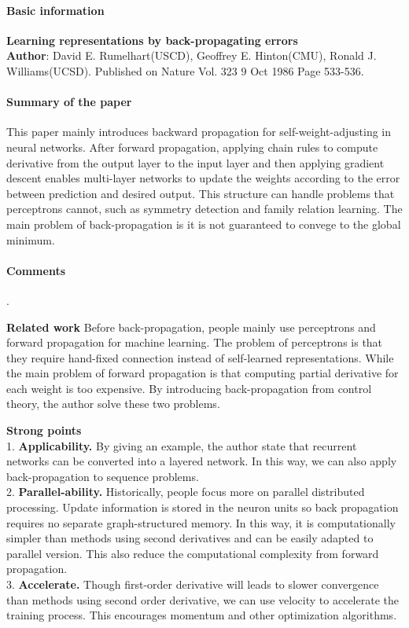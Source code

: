 \documentclass{article}
\begin{document}
\thispagestyle{empty}
\paragraph{Basic information}
\textbf{Learning representations by back-propagating errors}\\
\textbf{Author}: David E. Rumelhart(USCD), Geoffrey E. Hinton(CMU), Ronald J. Williams(UCSD). Published on Nature Vol. 323 9 Oct 1986 Page 533-536.

\paragraph{Summary of the paper}This paper mainly introduces backward propagation for self-weight-adjusting in neural networks. After forward propagation, applying chain rules to compute derivative from the output layer to the input layer and then applying gradient descent enables multi-layer networks to update the weights according to the error between prediction and desired output. This structure can handle problems that perceptrons cannot, such as symmetry detection and family relation learning. The main problem of back-propagation is it is not guaranteed to convege to the global minimum.

\paragraph{Comments}.

\textbf{Related work} Before back-propagation, people mainly use perceptrons and forward propagation for machine learning. The problem of perceptrons is that they require hand-fixed connection instead of self-learned representations. While the main problem of forward propagation is that computing partial derivative for each weight is too expensive. By introducing back-propagation from control theory, the author solve these two problems.

\textbf{Strong points}\\
1. \textbf{Applicability.} By giving an example, the author state that recurrent networks can be converted into a layered network. In this way, we can also apply back-propagation to sequence problems.\\
2. \textbf{Parallel-ability.} Historically, people focus more on parallel distributed processing. Update information is stored in the neuron units so back propagation requires no separate graph-structured memory. In this way, it is computationally simpler than methods using second derivatives and can be easily adapted to parallel version. This also reduce the computational complexity from forward propagation.\\
3. \textbf{Accelerate.} Though first-order derivative will leads to slower convergence than methods using second order derivative, we can use velocity to accelerate the training process. This encourages momentum and other optimization algorithms.
\end{document}
